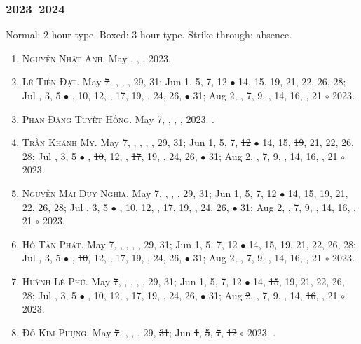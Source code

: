 \documentclass{article}
\begin{document}
\subsubsection{2023--2024}
Normal: 2-hour type. Boxed: 3-hour type. Strike through: absence.
\begin{enumerate}
	\item \textsc{Nguyễn Nhật Anh.} {\sf[In]} May , , , 2023. {\sf[Out]}
	\item \textsc{Lê Tiến Đạt.} May \st{7}, , , , 29, 31; Jun 1, 5, 7, 12 $\bullet$ 14, 15, 19, 21, 22, 26, 28; Jul , 3, 5 $\bullet$ , 10, 12, , 17, 19, , 24, 26,  $\bullet$ 31; Aug 2, , 7, 9, , 14, 16, , 21 $\circ$ 2023.
	\item \textsc{Phan Đặng Tuyết Hồng.} May 7, , , , 2023. {}. {\sf[Out]}
	\item \textsc{Trần Khánh My.} May 7, , , , , 29, 31; Jun 1, 5, 7, \st{12} $\bullet$ 14, 15, \st{19}, 21, 22, 26, 28; Jul , 3, 5 $\bullet$ , \st{10}, 12, , \st{17}, 19, , 24, 26,  $\bullet$ 31; Aug 2, , 7, 9, , 14, 16, , 21 $\circ$ 2023.
	\item \textsc{Nguyễn Mai Duy Nghĩa.} May 7, , , , 29, 31; Jun 1, 5, 7, 12 $\bullet$ 14, 15, 19, 21, 22, 26, 28; Jul , 3, 5 $\bullet$ , 10, 12, , 17, 19, , 24, 26,  $\bullet$ 31; Aug 2, , 7, 9, , 14, 16, , 21 $\circ$ 2023.
	\item \textsc{Hồ Tấn Phát.} May 7, , , , , 29, 31; Jun 1, 5, 7, 12 $\bullet$ 14, 15, 19, 21, 22, 26, 28; Jul , 3, 5 $\bullet$ , \st{10}, 12, , 17, 19, , 24, 26,  $\bullet$ 31; Aug 2, , 7, 9, , 14, 16, , 21 $\circ$ 2023.
	\item \textsc{Huỳnh Lê Phú.} May \st{7}, , , , , 29, 31; Jun 1, 5, 7, 12 $\bullet$ 14, \st{15}, 19, 21, 22, 26, 28; Jul , 3, 5 $\bullet$ , 10, 12, , 17, 19, , 24, 26,  $\bullet$ 31; Aug \st{2}, , 7, 9, , 14, \st{16}, , 21 $\circ$ 2023.
	\item \textsc{Đỗ Kim Phụng.} May \st{7}, , , , 29, \st{31}; Jun \st{1}, \st{5}, \st{7}, \st{12} $\circ$ 2023. {}. {\sf[Out]}

\end{enumerate}
\end{document}
